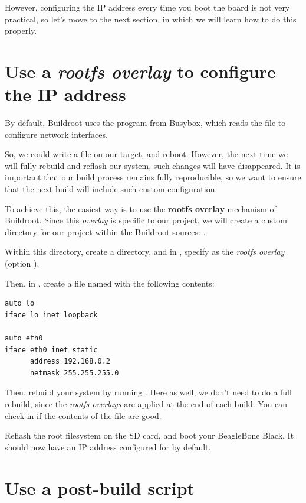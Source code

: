 However, configuring the IP address every time you boot the board is
not very practical, so let's move to the next section, in which we
will learn how to do this properly.

\section{Use a {\em rootfs overlay} to configure the IP address}

By default, Buildroot uses the  program from Busybox, which
reads the  file to configure network
interfaces.

So, we could write a  file on our
target, and reboot. However, the next time we will fully rebuild and
reflash our system, such changes will have disappeared. It is
important that our build process remains fully reproducible, so we
want to ensure that the next build will include such custom
configuration.

To achieve this, the easiest way is to use the {\bf rootfs overlay}
mechanism of Buildroot. Since this {\em overlay} is specific to our
project, we will create a custom directory for our project within the
Buildroot sources: .

Within this directory, create a  directory, and
in , specify
 as the {\em rootfs
overlay} (option ).

Then, in , create a
file named  with the following contents:

\begin{verbatim}
auto lo
iface lo inet loopback

auto eth0
iface eth0 inet static
      address 192.168.0.2
      netmask 255.255.255.0
\end{verbatim}

Then, rebuild your system by running . Here as well, we
don't need to do a full rebuild, since the {\em rootfs overlays} are
applied at the end of each build. You can check in
 if the contents of the
file are good.

Reflash the root filesystem on the SD card, and boot your BeagleBone
Black. It should now have an IP address configured for  by
default.

\section{Use a post-build script}

